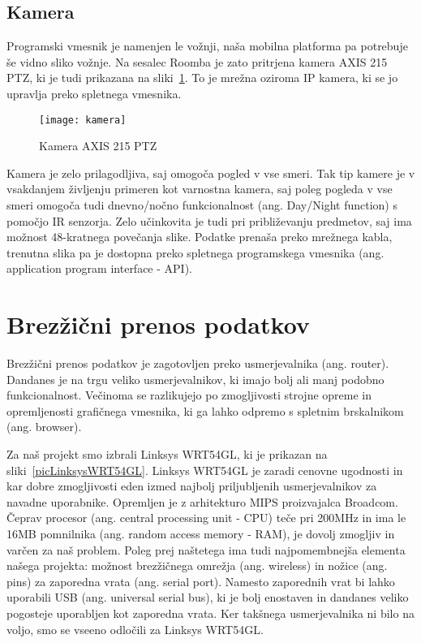 \documentclass[a4paper, 12pt]{book}
\begin{document}
\section{Kamera}
Programski vmesnik je namenjen le vožnji, naša mobilna platforma pa potrebuje še vidno sliko vožnje. Na sesalec Roomba je zato pritrjena kamera AXIS 215 PTZ, ki je tudi prikazana na sliki~\ref{picKamera}. To je mrežna oziroma IP kamera, ki se jo upravlja preko spletnega vmesnika. 

\begin{figure}[h]
	\centering
	\texttt{[image: kamera]}
	\caption{Kamera AXIS 215 PTZ~\cite{bibKamera}}
	\label{picKamera}
\end{figure}

Kamera je zelo prilagodljiva, saj omogoča pogled v vse smeri. Tak tip kamere je v vsakdanjem življenju primeren kot varnostna kamera, saj poleg pogleda v vse smeri omogoča tudi dnevno/nočno funkcionalnost (ang. Day/Night function) s pomočjo IR senzorja. Zelo učinkovita je tudi pri približevanju predmetov, saj ima možnost 48-kratnega povečanja slike. Podatke prenaša preko mrežnega kabla, trenutna slika pa je dostopna preko spletnega programskega vmesnika (ang. application program interface - API).

\chapter{Brezžični prenos podatkov}
Brezžični prenos podatkov je zagotovljen preko usmerjevalnika (ang. router). Dandanes je na trgu veliko usmerjevalnikov, ki imajo bolj ali manj podobno funkcionalnost. Večinoma se razlikujejo po zmogljivosti strojne opreme in opremljenosti grafičnega vmesnika, ki ga lahko odpremo s spletnim brskal\-nikom (ang. browser). 

Za naš projekt smo izbrali Linksys WRT54GL, ki je prikazan na sliki~\ref{picLinksysWRT54GL}. Linksys WRT54GL je zaradi cenovne ugodnosti in kar dobre zmogljivosti eden izmed najbolj priljubljenih usmerjevalnikov za navadne uporabnike. O\-prem\-ljen je z arhitekturo MIPS proizvajalca Broadcom. Čeprav procesor (ang. central processing unit - CPU) teče pri 200MHz in ima le 16MB pomnilnika (ang. random access memory - RAM), je dovolj zmogljiv in varčen za naš problem. Poleg prej naštetega ima tudi najpomembnejša elementa našega projekta: možnost brezžičnega omrežja (ang. wireless) in nožice (ang. pins) za zaporedna vrata (ang. serial port). Namesto zaporednih vrat bi lahko uporabili USB (ang. universal serial bus), ki je bolj enostaven in dandanes veliko pogosteje uporabljen kot zaporedna vrata. Ker takšnega usmerjevalnika ni bilo na voljo, smo se vseeno odločili za Linksys WRT54GL.
\end{document}

